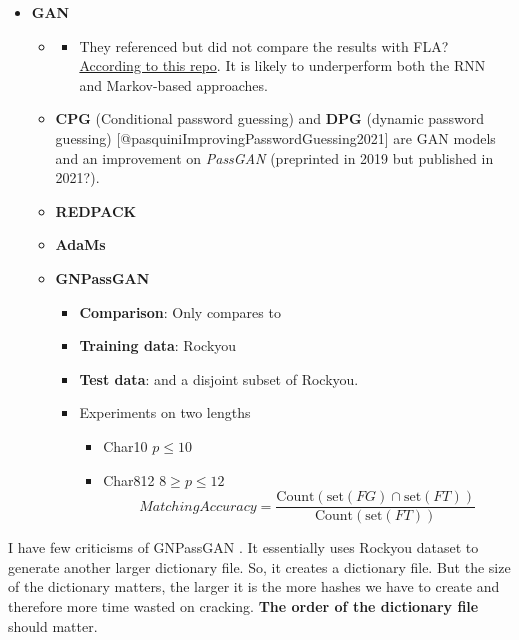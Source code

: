 \begin{itemize}
\item
  \textbf{GAN}

  \begin{itemize}
  \item
    \textbf{\passgan}

    \begin{itemize}
    \item
      They referenced but did not compare the results with FLA?
      \href{https://github.com/brannondorsey/PassGAN}{According to this
      repo}. It is likely to underperform both the RNN and Markov-based
      approaches.
    \end{itemize}
  \item
    \textbf{CPG} (Conditional password guessing) and \textbf{DPG}
    (dynamic password guessing)
    {[}@pasquiniImprovingPasswordGuessing2021{]} are GAN models and an
    improvement on \emph{PassGAN} (preprinted in 2019 but published in
    2021?).
  \item
    \textbf{REDPACK} \cite{nam_generating_2020} 
  \item
    \textbf{AdaMs} \cite{pasquini_reducing_2021}
  \item
    \textbf{GNPassGAN} \cite{yu_gnpassgan_2022}
    \begin{itemize}
    \item
      \textbf{Comparison}: Only compares to \passgan
    \item
      \textbf{Training data}: Rockyou
    \item
      \textbf{Test data}: \phpbb and a disjoint subset of Rockyou.
    \item
      Experiments on two lengths

      \begin{itemize}
      \item
        Char10 \(p \leq 10\)
      \item
        Char812 \(8 \geq p \leq 12\)
        \[Matching Accuracy = \frac{\text{Count}( \text{set}(F G) \cap \text{set}(F T ))}{\text{Count}(\text{set}(F T ))}\]
      \end{itemize}
    \end{itemize}
  \end{itemize}
\end{itemize}

I have few criticisms of GNPassGAN \cite{yu_gnpassgan_2022}. It essentially uses Rockyou
dataset to generate another larger dictionary file. So, it creates a
dictionary file. But the size of the dictionary matters, the larger it
is the more hashes we have to create and therefore more time wasted on
cracking. \textbf{The order of the dictionary file} should matter.

